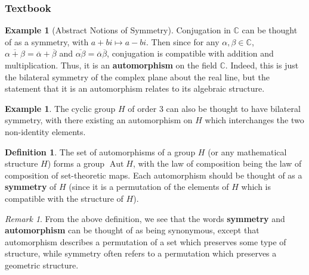 \documentclass[12pt]{article}
\theoremstyle{definition}
\newtheorem{defn}[thm]{Definition}
\newtheorem{eg}[thm]{Example}
\theoremstyle{remark}
\newtheorem{rmk}[thm]{Remark}
\numberwithin{equation}{section}
\newcommand\C{\mathbb C}    %
\newcommand\B[1]{\textbf{ #1}}
\DeclareMathOperator{\aut}{Aut}
\begin{document}
\subsubsection{Textbook}

\begin{eg}[Abstract Notions of Symmetry]
        Conjugation in $\C$ can be thought of as a symmetry, with $a+bi \mapsto a-bi$. Then since for any $\alpha,\beta \in \C$, $\overline{\alpha+\beta} = \overline{\alpha} + \overline{\beta}$ and $\overline{\alpha\beta} = \overline{\alpha}\overline{\beta}$, conjugation is compatible with addition and multiplication. Thus, it is an \B{automorphism} on the field $\C$. Indeed, this is just the bilateral symmetry of the complex plane about the real line, but the statement that it is an automorphism relates to its algebraic structure.
\end{eg}

\vspace{15pt}

\begin{eg}
        The cyclic group $H$ of order 3 can also be thought to have bilateral symmetry, with there existing an automorphism on $H$ which interchanges the two non-identity elements.
\end{eg}

\vspace{15pt}

\begin{defn}
        The set of automorphisms of a group $H$ (or any mathematical structure $H$) forms a group $\aut H$, with the law of composition being the law of composition of set-theoretic maps. Each automorphism should be thought of as a \B{symmetry} of $H$ (since it is a permutation of the elements of $H$ which is compatible with the structure of $H$). 
\end{defn}

\vspace{15pt}

\begin{rmk}
        From the above definition, we see that the words \B{symmetry} and \B{automorphism} can be thought of as being synonymous, except that automorphism describes a permutation of a set which preserves some type of structure, while symmetry often refers to a permutation which preserves a geometric structure.
\end{rmk}

\vspace{15pt}
\end{document}
